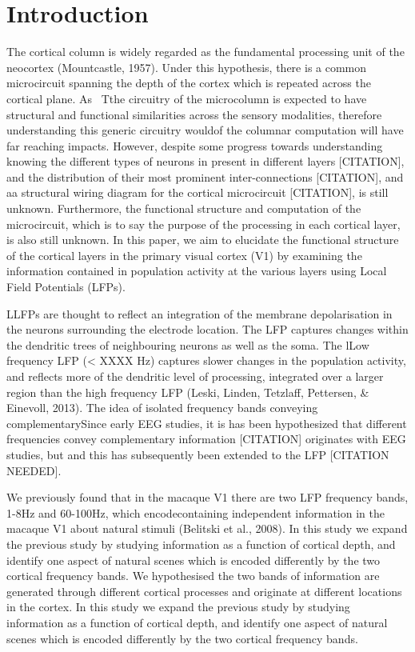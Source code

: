 \section{Introduction}
The cortical column is widely regarded as the fundamental processing unit of the neocortex (Mountcastle, 1957). Under this hypothesis, there is a common microcircuit spanning the depth of the cortex which is repeated across the cortical plane. As \ Tthe circuitry of the microcolumn is expected to have structural and functional similarities across the sensory modalities, therefore understanding this generic circuitry wouldof the columnar computation will have far reaching impacts. However, despite some progress towards understanding knowing the different types of neurons in present in different layers [CITATION], and the distribution of their most prominent inter-connections [CITATION], and aa structural wiring diagram for the cortical microcircuit [CITATION], is still unknown. Furthermore, the functional structure and computation of the microcircuit, which is to say the purpose of the processing in each cortical layer, is also still unknown. In this paper, we aim to elucidate the functional structure of the cortical layers in the primary visual cortex (V1) by examining the information contained in population activity at the various layers using Local Field Potentials (LFPs).

LLFPs are thought to reflect an integration of the membrane depolarisation in the neurons surrounding the electrode location. The LFP captures changes within the dendritic trees of neighbouring neurons as well as the soma. The lLow frequency LFP ({\textless} XXXX Hz) captures slower changes in the population activity, and reflects more of the dendritic level of processing, integrated over a larger region than the high frequency LFP (Leski, Linden, Tetzlaff, Pettersen, \& Einevoll, 2013). The idea of isolated frequency bands conveying complementarySince early EEG studies, it is has been hypothesized that different frequencies convey complementary information [CITATION] originates with EEG studies, but and this has subsequently been extended to the LFP [CITATION NEEDED]. 

We previously found that in the macaque V1 there are two LFP frequency bands, 1-8Hz and 60-100Hz, which encodecontaining independent information in the macaque V1 about natural stimuli (Belitski et al., 2008). In this study we expand the previous study by studying information as a function of cortical depth, and identify one aspect of natural scenes which is encoded differently by the two cortical frequency bands. We hypothesised the two bands of information are generated through different cortical processes and originate at different locations in the cortex. In this study we expand the previous study by studying information as a function of cortical depth, and identify one aspect of natural scenes which is encoded differently by the two cortical frequency bands.

